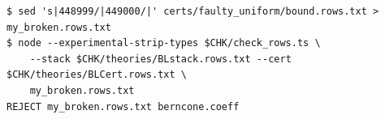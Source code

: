 \begin{Verbatim}[fontsize=\small,frame=leftline,rulecolor=\color{accentmid},framesep=3mm,xleftmargin=3mm]
$ sed 's|448999/|449000/|' certs/faulty_uniform/bound.rows.txt > my_broken.rows.txt
$ node --experimental-strip-types $CHK/check_rows.ts \
    --stack $CHK/theories/BLstack.rows.txt --cert $CHK/theories/BLCert.rows.txt \
    my_broken.rows.txt
REJECT my_broken.rows.txt berncone.coeff
\end{Verbatim}

